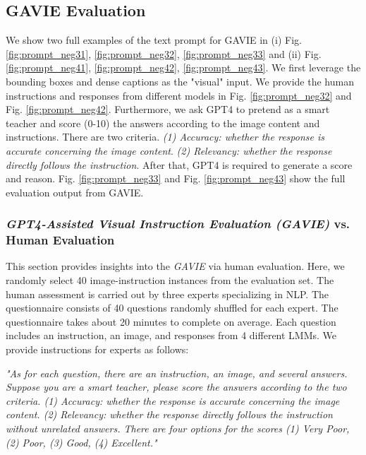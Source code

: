 \subsection{GAVIE Evaluation}
We show two full examples of the text prompt for GAVIE in (i) Fig. \ref{fig:prompt_neg31}, \ref{fig:prompt_neg32}, \ref{fig:prompt_neg33} and (ii) Fig. \ref{fig:prompt_neg41}, \ref{fig:prompt_neg42}, \ref{fig:prompt_neg43}. We first leverage the bounding boxes and dense captions as the "visual" input. We provide the human instructions and responses from different models in Fig. \ref{fig:prompt_neg32} and Fig. \ref{fig:prompt_neg42}. Furthermore, we ask GPT4 to pretend as a smart teacher and score (0-10) the answers according to the image content and instructions. There are two criteria. \textit{(1) Accuracy: whether the response is accurate concerning the image content}. \textit{(2) Relevancy: whether the response directly follows the instruction}. After that, GPT4 is required to generate a score and reason. Fig. \ref{fig:prompt_neg33}  and Fig. \ref{fig:prompt_neg43} show the full evaluation output from GAVIE.







\subsubsection{\textit{GPT4-Assisted Visual Instruction Evaluation (GAVIE)} vs. Human Evaluation}


This section provides insights into the \textit{GAVIE} via human evaluation. Here, we randomly select 40 image-instruction instances from the evaluation set. The human assessment is carried out by three experts specializing in NLP. The questionnaire consists of 40 questions randomly shuffled for each expert. The questionnaire takes about 20 minutes to complete on average. Each question includes an instruction, an image, and responses from 4 different LMMs. We provide instructions for experts as follows: 

\textit{"As for each question, there are an instruction, an image, and several answers. Suppose you are a smart teacher, please score the answers according to the two criteria. (1) Accuracy: whether the response is accurate concerning the image content. (2) Relevancy: whether the response directly follows the instruction without unrelated answers. There are four options for the scores (1) Very Poor, (2) Poor, (3) Good, (4) Excellent."}

